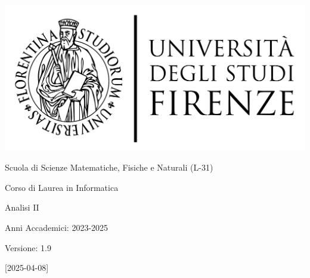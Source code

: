 \documentclass[11pt]{article}
\newcommand{\myDegree}{Corso di Laurea in Informatica}
\newcommand{\myFaculty}{
	Scuola di Scienze Matematiche, Fisiche e Naturali (L{-}31)}
\newcommand{\myTime}{Anni Accademici{:} 2023{-}2025}
\newcommand{\myVersion}{1.9}
\newcommand{\myVersionReleaseDate}{2025{-}04{-}08}
\begin{document}
\begin{titlepage}
   \begin{center}
      \hfill
      \vspace{2cm}

      \begingroup
      \large
      \includegraphics[scale=0.15]{images/unifi-logo}

      \myFaculty{}

      \myDegree{}
      \endgroup

      \vspace{5cm}

      \begingroup
      \LARGE
      \color{red} Analisi II
      \endgroup
      \medskip

      \myTime{}

      \vfill

      \begingroup
      \hfill Versione: \myVersion{}

      \hfill [\myVersionReleaseDate{}]
      \endgroup

   \end{center}
\end{titlepage}
\newpage

\tableofcontents
\newpage


\newpage


\newpage


\newpage


\newpage

\appendix

\newpage
\end{document}
